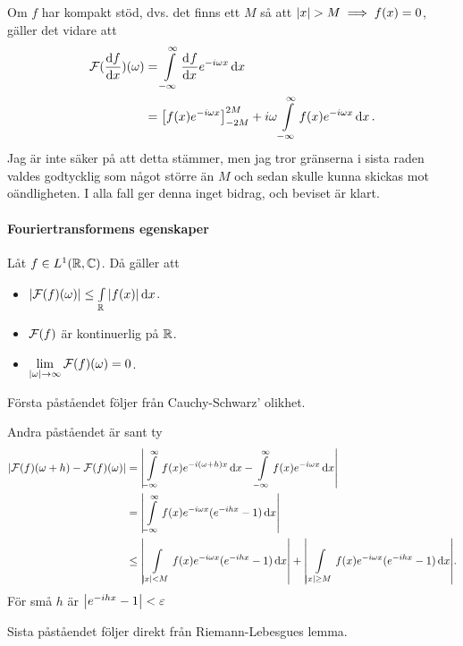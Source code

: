 Om $f$ har kompakt stöd, dvs. det finns ett $M$ så att $\abs{x} > M\implies f(x) = 0$,  gäller det vidare att
\begin{align*}
	\mathcal{F}(\dv{f}{x})(\omega) &= \int\limits_{-\infty}^{\infty}\dv[]{f}{x} (x)e^{-i\omega x}\dd{x} \\
	                        &= \left[f(x)e^{-i\omega x}\right]_{-2M}^{2M} + i\omega\int\limits_{-\infty}^{\infty}f(x)e^{-i\omega x}\dd{x}.
\end{align*}
Jag är inte säker på att detta stämmer, men jag tror gränserna i sista raden valdes godtycklig som något större än $M$ och sedan skulle kunna skickas mot oändligheten. I alla fall ger denna inget bidrag, och beviset är klart.

\paragraph{Fouriertransformens egenskaper}
Låt $f\in L^{1}(\mathbb{R}, \mathbb{C})$. Då gäller att
\begin{itemize}
	\item $\abs{\mathcal{F}(f)(\omega)} \leq \int\limits_{\mathbb{R}}^{}\abs{f(x)}\dd{x}$.
	\item $\mathcal{F}(f)$ är kontinuerlig på $\mathbb{R}$.
	\item $\lim\limits_{\abs{\omega}\to\infty}\mathcal{F}(f)(\omega) = 0$.
\end{itemize}

\proof
Första påståendet följer från Cauchy-Schwarz' olikhet.

Andra påståendet är sant ty
\begin{align*}
	\abs{\mathcal{F}(f)(\omega + h) - \mathcal{F}(f)(\omega)} &= \abs{\int\limits_{-\infty}^{\infty}f(x)e^{-i(\omega + h)x}\dd{x} - \int\limits_{-\infty}^{\infty}f(x)e^{-i\omega x}\dd{x}} \\
	                                            &= \abs{\int\limits_{-\infty}^{\infty}f(x)e^{-i\omega x}(e^{-ihx} - 1)\dd{x}} \\
	                                            &\leq \abs{\int\limits_{\abs{x} < M}^{}f(x)e^{-i\omega x}(e^{-ihx} - 1)\dd{x}} + \abs{\int\limits_{\abs{x} \geq M}^{}f(x)e^{-i\omega x}(e^{-ihx} - 1)\dd{x}}.
\end{align*}
För små $h$ är $\abs{e^{-ihx} - 1} < \varepsilon$

Sista påståendet följer direkt från Riemann-Lebesgues lemma.
